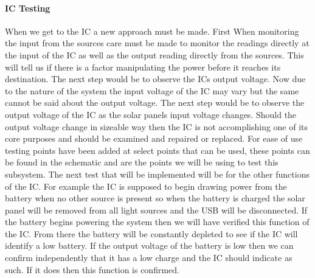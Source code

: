 \paragraph{IC Testing}
When we get to the IC a new approach must be made. First When monitoring the input from the sources care must be made to monitor the readings directly at the input of the IC as well as the output reading directly from the sources. This will tell us if there is a factor manipulating the power before it reaches its destination. The next step would be to observe the ICs output voltage. Now due to the nature of the system the input voltage of the IC may vary but the same cannot be said about the output voltage. The next step would be to observe the output voltage of the IC as the solar panels input voltage changes. Should the output voltage change in sizeable way then the IC is not accomplishing one of its core purposes and should be examined and repaired or replaced. For ease of use testing points have been added at select points that can be used, these points can be found in the schematic and are the points we will be using to test this subsystem. The next test that will be implemented will be for the other functions of the IC. For example the IC is supposed to begin drawing power from the battery when no other source is present so when the battery is charged the solar panel will be removed from all light sources and the USB will be disconnected. If the battery begins powering the system then we will have verified this function of the IC. From there the battery will be constantly depleted to see if the IC will identify a low battery. If the output voltage of the battery is low then we can confirm independently that it has a low charge and the IC should indicate as such. If it does then this function is confirmed.

